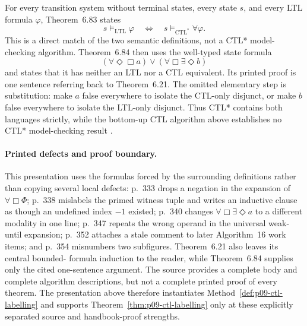For every transition system without terminal states, every state \(s\), and
every LTL formula \(\varphi\), Theorem~6.83 states
\[
 s\models_{\mathrm{LTL}}\varphi
 \quad\Longleftrightarrow\quad
 s\models_{\mathrm{CTL}^*}\forall\varphi.
\]
This is a direct match of the two semantic definitions, not a CTL* model-
checking algorithm.  Theorem~6.84 then uses the well-typed state formula
\[
 (\forall\Diamond\Box a)\lor
 (\forall\Box\exists\Diamond b)
\]
and states that it has neither an LTL nor a CTL equivalent.  Its printed proof
is one sentence referring back to Theorem~6.21.  The omitted elementary step
is substitution: make \(a\) false everywhere to isolate the CTL-only
disjunct, or make \(b\) false everywhere to isolate the LTL-only disjunct.
Thus CTL* contains both languages strictly, while the bottom-up CTL algorithm
above establishes no CTL* model-checking result
\cite[defs.~6.80--6.82 and thms.~6.83--6.84; pp.~422--425]{BaierKatoen2008}.

\paragraph{Printed defects and proof boundary.}
This presentation uses the formulas forced by the surrounding definitions
rather than copying several local defects: p.~333 drops a negation in the
expansion of \(\forall\Box\Phi\); p.~338 mislabels the primed witness tuple
and writes an inductive clause as though an undefined index \(-1\) existed; p.~340
changes \(\forall\Box\exists\Diamond a\) to a different modality in one
line; p.~347 repeats the wrong operand in the universal weak-until expansion;
p.~352 attaches a stale comment to later Algorithm~16 work items; and p.~354
misnumbers two subfigures.  Theorem~6.21 also leaves its central bounded-
formula induction to the reader, while Theorem~6.84 supplies only the cited
one-sentence argument.  The source provides a complete body and complete
algorithm descriptions, but not a complete printed proof of every theorem.
The presentation above therefore instantiates
Method~\ref{def:p09-ctl-labelling} and supports
Theorem~\ref{thm:p09-ctl-labelling} only at these explicitly separated source
and handbook-proof strengths.
